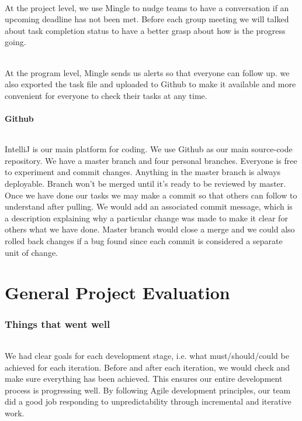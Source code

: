 \documentclass[a4paper,11pt,titlepage]{article}
\begin{document}
\paragraph{}
At the project level, we use Mingle to nudge teams to have a conversation if an upcoming deadline has not been met. Before each group meeting we will talked about task completion status to have a better grasp about how is the progress going.
\paragraph{}
At the program level, Mingle sends us alerts so that everyone can follow up. we also exported the task file and uploaded to Github to make it available and more convenient  for everyone to check their tasks at any time.
 
\subsection{Github}
\paragraph{}
IntelliJ is our main platform for coding. We use Github as our main source-code repository. We have a master branch and four personal branches. Everyone is free to experiment and commit changes. Anything in the master branch is always deployable. Branch won't be merged until it's ready to be reviewed by master. Once we have done our tasks we may make a commit so that others can follow to understand after pulling. We would add an associated commit message, which is a description explaining why a particular change was made to make it clear for others what we have done. Master branch would close a merge and we could also rolled  back changes if a bug found since each commit is considered a separate unit of change.

\part{General Project Evaluation}
\section{Things that went well}
\paragraph{}
We had clear goals for each development stage, i.e. what must/should/could be achieved for each iteration. Before and after each iteration, we would check and make sure everything has been achieved. This ensures our entire development process is progressing well. By following Agile development principles, our team did a good job responding to unpredictability through incremental and iterative work. 
\end{document}
